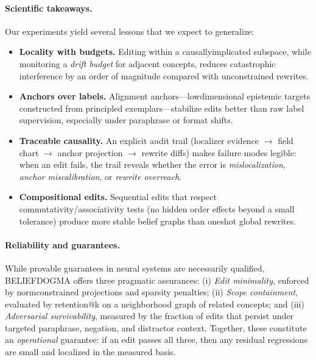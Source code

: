 \documentclass[11pt]{article}
\begin{document}
\paragraph{Scientific takeaways.}
Our experiments yield several lessons that we expect to generalize:
\begin{itemize}
\item \textbf{Locality with budgets.} Editing within a causally\textendash implicated subspace, while monitoring a \emph{drift budget} for adjacent concepts, reduces catastrophic interference by an order of magnitude compared with unconstrained rewrites.
\item \textbf{Anchors over labels.} Alignment anchors---low\textendash dimensional epistemic targets constructed from principled exemplars---stabilize edits better than raw label supervision, especially under paraphrase or format shifts.
\item \textbf{Traceable causality.} An explicit audit trail (localizer evidence $\rightarrow$ field chart $\rightarrow$ anchor projection $\rightarrow$ rewrite diffs) makes failure modes legible: when an edit fails, the trail reveals whether the error is \emph{mislocalization}, \emph{anchor miscalibration}, or \emph{rewrite overreach}.
\item \textbf{Compositional edits.} Sequential edits that respect commutativity/associativity tests (no hidden order effects beyond a small tolerance) produce more stable belief graphs than one\textendash shot global rewrites.
\end{itemize}

\paragraph{Reliability and guarantees.}
While provable guarantees in neural systems are necessarily qualified, \textsc{BELIEF\textendash DOGMA} offers three pragmatic assurances: (i) \emph{Edit minimality}, enforced by norm\textendash constrained projections and sparsity penalties; (ii) \emph{Scope containment}, evaluated by retention@k on a neighborhood graph of related concepts; and (iii) \emph{Adversarial survivability}, measured by the fraction of edits that persist under targeted paraphrase, negation, and distractor context. Together, these constitute an \emph{operational} guarantee: if an edit passes all three, then any residual regressions are small and localized in the measured basis.
\end{document}
